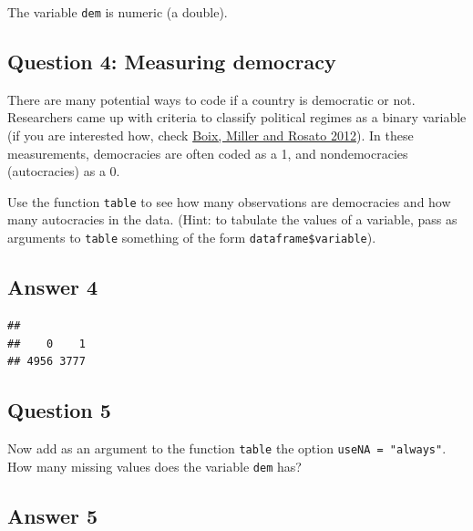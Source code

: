 \documentclass[
  11pt,
  letterpaper]{article}
\newenvironment{Shaded}{\begin{snugshade}}{\end{snugshade}}
\newcommand{\AttributeTok}[1]{\textcolor[rgb]{0.13,0.29,0.53}{#1}}
\newcommand{\FunctionTok}[1]{\textcolor[rgb]{0.13,0.29,0.53}{\textbf{#1}}}
\newcommand{\NormalTok}[1]{#1}
\newcommand{\SpecialCharTok}[1]{\textcolor[rgb]{0.81,0.36,0.00}{\textbf{#1}}}
\newcommand{\StringTok}[1]{\textcolor[rgb]{0.31,0.60,0.02}{#1}}
\begin{document}
The variable \texttt{dem} is numeric (a double).

\subsection{Question 4: Measuring
democracy}\label{question-4-measuring-democracy}

There are many potential ways to code if a country is democratic or not.
Researchers came up with criteria to classify political regimes as a
binary variable (if you are interested how, check
\href{https://journals.sagepub.com/doi/10.1177/0010414012463905}{Boix,
Miller and Rosato 2012}). In these measurements, democracies are often
coded as a 1, and nondemocracies (autocracies) as a 0.

Use the function \texttt{table} to see how many observations are
democracies and how many autocracies in the data. (Hint: to tabulate the
values of a variable, pass as arguments to \texttt{table} something of
the form \texttt{dataframe\$variable}).

\subsection{Answer 4}\label{answer-4}

\begin{Shaded}
\end{Shaded}

\begin{verbatim}
## 
##    0    1 
## 4956 3777
\end{verbatim}

\subsection{Question 5}\label{question-5}

Now add as an argument to the function \texttt{table} the option
\texttt{useNA\ =\ "always"}. How many missing values does the variable
\texttt{dem} has?

\subsection{Answer 5}\label{answer-5}

\begin{Shaded}
\end{Shaded}
\end{document}
